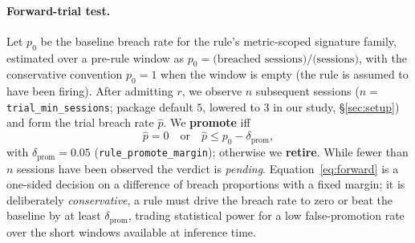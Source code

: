 \documentclass[letterpaper]{article} %
\newcommand{\dpromote}{\delta_{\mathrm{prom}}}
\begin{document}
\paragraph{Forward-trial test.} Let $p_0$ be the baseline breach rate for the rule's
metric-scoped signature family, estimated over a pre-rule window as $p_0 = \text{(breached
sessions)}/\text{(sessions)}$, with the conservative convention $p_0 = 1$ when the window is
empty (the rule is assumed to have been firing).
After admitting $r$, we observe $n$ subsequent sessions ($n=$ \texttt{trial\_min\_sessions};
package default $5$, lowered to $3$ in our study, \S\ref{sec:setup}) and form the trial breach
rate $\hat{p}$. We \textbf{promote} iff
\begin{equation}
  \hat{p} = 0 \quad\text{or}\quad \hat{p} \le p_0 - \dpromote,
  \label{eq:forward}
\end{equation}
with $\dpromote = 0.05$ (\texttt{rule\_promote\_margin}); otherwise we \textbf{retire}. While
fewer than $n$ sessions have been observed the verdict is \emph{pending}.
Equation~\eqref{eq:forward} is a one-sided decision on a difference of breach proportions with
a fixed margin; it is deliberately \emph{conservative}, a rule must drive the breach rate to
zero or beat the baseline by at least $\dpromote$, trading statistical power for a low
false-promotion rate over the short windows available at inference time.
\end{document}
